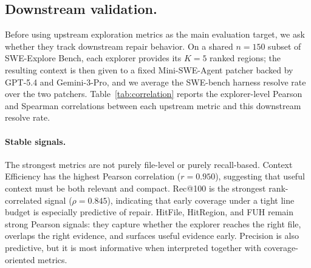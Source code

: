 








 
\subsection{Downstream validation.}
\label{sec:downstream}
 


Before using upstream exploration metrics as the main evaluation target, we ask whether they track downstream repair behavior. On a shared $n{=}150$ subset of SWE-Explore Bench, each explorer provides its $K{=}5$ ranked regions; the resulting context is then given to a fixed Mini-SWE-Agent patcher backed by GPT-5.4 and Gemini-3-Pro, and we average the SWE-bench harness resolve rate over the two patchers. Table~\ref{tab:correlation} reports the explorer-level Pearson and Spearman correlations between each upstream metric and this downstream resolve rate.
 
\paragraph{Stable signals.}
The strongest metrics are not purely file-level or purely recall-based. Context Efficiency has the highest Pearson correlation ($r{=}0.950$), suggesting that useful context must be both relevant and compact. Rec@100 is the strongest rank-correlated signal ($\rho{=}0.845$), indicating that early coverage under a tight line budget is especially predictive of repair. HitFile, HitRegion, and FUH remain strong Pearson signals: they capture whether the explorer reaches the right file, overlaps the right evidence, and surfaces useful evidence early. Precision is also predictive, but it is most informative when interpreted together with coverage-oriented metrics.

 

